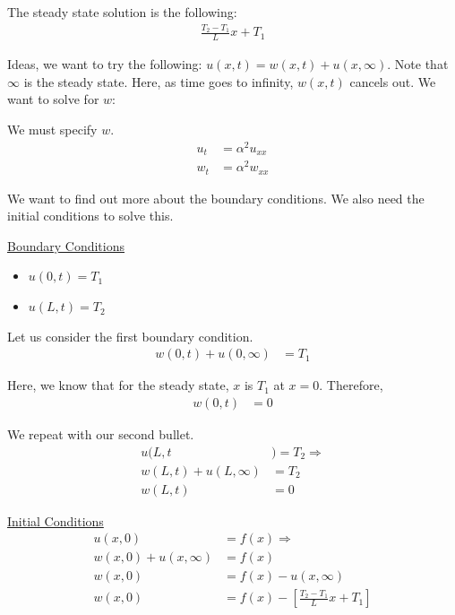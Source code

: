 \documentclass{article}
\begin{document}

The steady state solution is the following:
%
\begin{align}
  \frac{T_2 - T_1}{L} x + T_1
\end{align}

Ideas, we want to try the following: $u(x, t) = w(x, t) + u(x, \infty)$. Note that $\infty$ is the steady state. Here, as time goes to infinity, $w(x, t)$ cancels out. We want to solve for $w$:

We must specify $w$.
%
\begin{align}
  u_t & = \alpha^2 u_{xx}\\
  w_t & = \alpha^2 w_{xx}
\end{align}

We want to find out more about the boundary conditions. We also need the initial conditions to solve this.

\underline{Boundary Conditions}
\begin{itemize}
  \item $u(0, t) = T_1$
  \item $u(L, t) = T_2$
\end{itemize}

Let us consider the first boundary condition.
%
\begin{align}
  w(0, t) + u(0, \infty) & = T_1
\end{align}

Here, we know that for the steady state, $x$ is $T_1$ at $x = 0$. Therefore,
%
\begin{align}
  w(0, t) & = 0
\end{align}

We repeat with our second bullet.
%
\begin{align}
  u(L, t &) = T_2 \Rightarrow\\
  w(L, t) + u(L, \infty) & = T_2\\
  w(L, t) & = 0
\end{align}

\underline{Initial Conditions}
%
\begin{align}
  u(x, 0) & = f(x) \Rightarrow\\
  w(x, 0) + u(x, \infty) & = f(x)\\
  w(x, 0) & = f(x) - u(x, \infty)\\
  w(x, 0) & = f(x) - \left[ \frac{T_2 - T_1}{L} x + T_1 \right]
\end{align}

\ex
\end{document}
